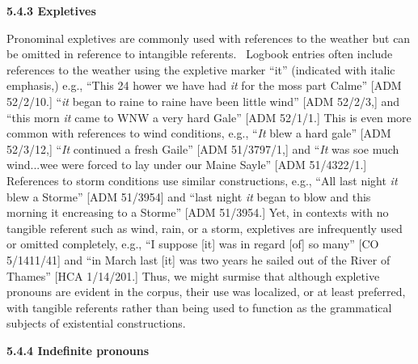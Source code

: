 \begin{styleStandard}
\textbf{5.4.3 Expletives}
\end{styleStandard}


\begin{styleStandard}
Pronominal expletives are commonly used with references to the weather but can be omitted in reference to intangible referents. \ Logbook entries often include references to the weather using the expletive marker “it” (indicated with italic emphasis,) e.g., “This 24 hower we have had \textit{it }for the moss part Calme” [ADM 52/2/10.] “\textit{it} began to raine to raine have been little wind” [ADM 52/2/3,] and “this morn \textit{it }came to WNW a very hard Gale” [ADM 52/1/1.] This is even more common with references to wind conditions, e.g., “\textit{It} blew a hard gale” [ADM 52/3/12,] “\textit{It} continued a fresh Gaile” [ADM 51/3797/1,] and “\textit{It} was soe much wind...wee were forced to lay under our Maine Sayle” [ADM 51/4322/1.] References to storm conditions use similar constructions, e.g., “All last night\textit{ it} blew a Storme” [ADM 51/3954] and “last night \textit{it }began to blow and this morning it encreasing to a Storme” [ADM 51/3954.] Yet, in contexts with no tangible referent such as wind, rain, or a storm, expletives are infrequently used or omitted completely, e.g., “I suppose [it] was in regard [of] so many” [CO 5/1411/41] and “in March last [it] was two years he sailed out of the River of Thames” [HCA 1/14/201.] Thus, we might surmise that although expletive pronouns are evident in the corpus, their use was localized, or at least preferred, with tangible referents rather than being used to function as the grammatical subjects of existential constructions.
\end{styleStandard}


\begin{styleStandard}
\textbf{5.4.4 Indefinite pronouns}
\end{styleStandard}


